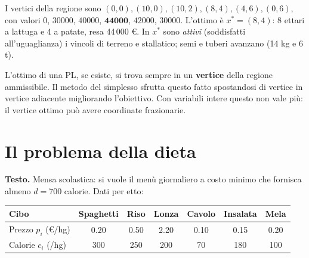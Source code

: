 \begin{center}
\end{center}

I vertici della regione sono $(0,0),(10,0),(10,2),(8,4),(4,6),(0,6)$, con valori $0$, $30000$, $40000$, $\mathbf{44000}$, $42000$, $30000$. L'ottimo è $x^*=(8,4)$: 8 ettari a lattuga e 4 a patate, resa 44\,000 \euro. In $x^*$ sono \emph{attivi} (soddisfatti all'uguaglianza) i vincoli di terreno e stallatico; semi e tuberi avanzano (14 kg e 6 t).

\begin{oss}[anticipazione]
L'ottimo di una PL, se esiste, si trova sempre in un \textbf{vertice} della regione ammissibile. Il metodo del simplesso sfrutta questo fatto spostandosi di vertice in vertice adiacente migliorando l'obiettivo. Con variabili intere questo non vale più: il vertice ottimo può avere coordinate frazionarie.
\end{oss}

\section{Il problema della dieta}\label{sec:dieta}

\textbf{Testo.} Mensa scolastica: si vuole il menù giornaliero a costo minimo che fornisca almeno $d=700$ calorie. Dati per etto:

\begin{center}
\begin{tabular}{@{}lcccccc@{}}
\toprule
Cibo & Spaghetti & Riso & Lonza & Cavolo & Insalata & Mela\\ \midrule
Prezzo $p_i$ (\euro/hg) & 0.20 & 0.50 & 2.20 & 0.10 & 0.15 & 0.20\\
Calorie $c_i$ (/hg) & 300 & 250 & 200 & 70 & 180 & 100\\
\bottomrule
\end{tabular}
\end{center}

